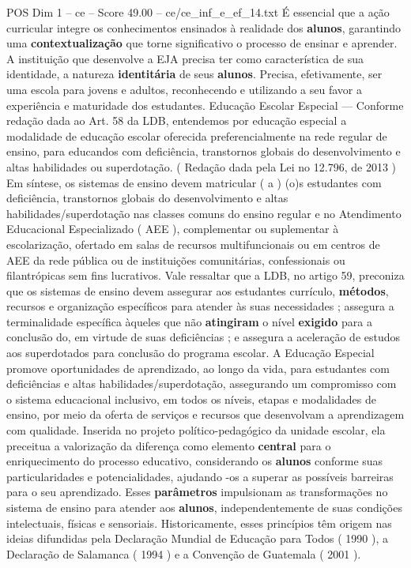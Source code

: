 \begin{textsample}{POS Dim 1 – ce – Score 49.00 – ce/ce\_inf\_e\_ef\_14.txt}
É essencial que a ação curricular integre os conhecimentos ensinados à realidade dos \textbf{alunos}, garantindo uma \textbf{contextualização} que torne significativo o processo de ensinar e aprender.
A instituição que desenvolve a EJA precisa ter como característica de sua identidade, a natureza \textbf{identitária} de seus \textbf{alunos}.
Precisa, efetivamente, ser uma escola para jovens e adultos, reconhecendo e utilizando a seu favor a experiência e maturidade dos estudantes.
Educação Escolar Especial — Conforme redação dada ao Art. 58 da LDB, entendemos por educação especial a modalidade de educação escolar oferecida preferencialmente na rede regular de ensino, para educandos com deficiência, transtornos globais do desenvolvimento e altas habilidades ou superdotação. ( Redação dada pela Lei no 12.796, de 2013 ) Em síntese, os sistemas de ensino devem matricular ( a ) (o)s estudantes com deficiência, transtornos globais do desenvolvimento e altas habilidades/superdotação nas classes comuns do ensino regular e no Atendimento Educacional Especializado ( AEE ), complementar ou suplementar à escolarização, ofertado em salas de recursos multifuncionais ou em centros de AEE da rede pública ou de instituições comunitárias, confessionais ou filantrópicas sem fins lucrativos.
Vale ressaltar que a LDB, no artigo 59, preconiza que os sistemas de ensino devem assegurar aos estudantes currículo, \textbf{métodos}, recursos e organização específicos para atender às suas necessidades ; assegura a terminalidade específica àqueles que não \textbf{atingiram} o nível \textbf{exigido} para a conclusão do, em virtude de suas deficiências ; e assegura a aceleração de estudos aos superdotados para conclusão do programa escolar.
A Educação Especial promove oportunidades de aprendizado, ao longo da vida, para estudantes com deficiências e altas habilidades/superdotação, assegurando um compromisso com o sistema educacional inclusivo, em todos os níveis, etapas e modalidades de ensino, por meio da oferta de serviços e recursos que desenvolvam a aprendizagem com qualidade.
Inserida no projeto político-pedagógico da unidade escolar, ela preceitua a valorização da diferença como elemento \textbf{central} para o enriquecimento do processo educativo, considerando os \textbf{alunos} conforme suas particularidades e potencialidades, ajudando -os a superar as possíveis barreiras para o seu aprendizado.
Esses \textbf{parâmetros} impulsionam as transformações no sistema de ensino para atender aos \textbf{alunos}, independentemente de suas condições intelectuais, físicas e sensoriais.
Historicamente, esses princípios têm origem nas ideias difundidas pela Declaração Mundial de Educação para Todos ( 1990 ), a Declaração de Salamanca ( 1994 ) e a Convenção de Guatemala ( 2001 ).

\end{textsample}
